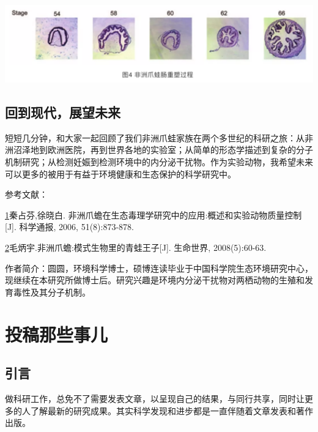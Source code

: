 \documentclass[]{book}
\begin{document}
\includegraphics[width=6.67in]{images/qingwa4}

\hypertarget{ux56deux5230ux73b0ux4ee3ux5c55ux671bux672aux6765}{%
\subsection{回到现代，展望未来}\label{ux56deux5230ux73b0ux4ee3ux5c55ux671bux672aux6765}}

短短几分钟，和大家一起回顾了我们非洲爪蛙家族在两个多世纪的科研之旅：从非洲沼泽地到欧洲医院，再到世界各地的实验室；从简单的形态学描述到复杂的分子机制研究；从检测妊娠到检测环境中的内分泌干扰物。作为实验动物，我希望未来可以更多的被用于有益于环境健康和生态保护的科学研究中。

参考文献：

\href{陈心想，耿增超。西北农林科技大学学报（自然科学版），2013，41:\%20167-174．}{1}秦占芬,徐晓白. 非洲爪蟾在生态毒理学研究中的应用:概述和实验动物质量控制{[}J{]}. 科学通报, 2006, 51(8):873-878.

\href{Kezhen\%20Qian,\%20Ajay\%20Kumar,\%20et.al.\%20Renew.\%20and\%20Sustain.\%20Energy\%20Reviews,\%202015,\%2042:\%201055-1064.}{2}毛炳宇.非洲爪蟾:模式生物里的青蛙王子{[}J{]}. 生命世界, 2008(5):60-63.

作者简介：圆圆，环境科学博士，硕博连读毕业于中国科学院生态环境研究中心，现继续在本研究所做博士后。研究兴趣是环境内分泌干扰物对两栖动物的生殖和发育毒性及其分子机制。

\hypertarget{ux6295ux7a3fux90a3ux4e9bux4e8bux513f}{%
\section{投稿那些事儿}\label{ux6295ux7a3fux90a3ux4e9bux4e8bux513f}}

\hypertarget{ux5f15ux8a00-2}{%
\subsection{引言}\label{ux5f15ux8a00-2}}

做科研工作，总免不了需要发表文章，以呈现自己的结果，与同行共享，同时让更多的人了解最新的研究成果。其实科学发现和进步都是一直伴随着文章发表和著作出版。
\end{document}
